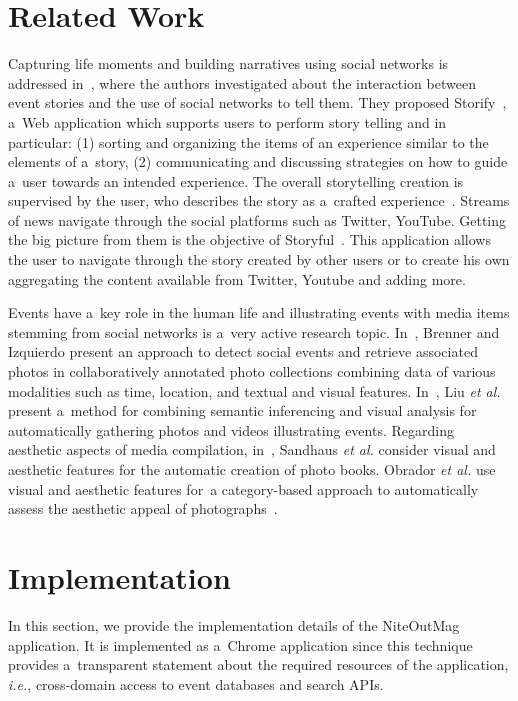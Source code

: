 \documentclass[runningheads,a4paper]{llncs}
\begin{document}
{\section{Related Work}                                                      \label{sec:related-work}
Capturing life moments and building narratives using social networks is addressed in~\cite{Atosy2011}, where the authors investigated about the interaction between event stories and the use of social networks to tell them. They proposed Storify~\cite{Storify2012}, a~Web application which supports users to perform story telling and in particular: (1) sorting and organizing the items of an experience similar to the elements of a~story, (2) communicating and discussing strategies on how to guide a~user towards an intended experience. The overall storytelling creation is supervised by the user, who describes the story as a~crafted experience~\cite{Hassenzahl2010}. Streams of news navigate through the social platforms such as Twitter, YouTube. Getting the big picture from them is the objective of Storyful~\cite{Storyful2012}. This application allows the user to navigate through the story created by other users or to create his own aggregating the content available from Twitter, Youtube and adding more.

Events have a~key role in the human life and illustrating events with media items stemming from social networks is a~very active research topic. In~\cite{Brenner2012}, Brenner and Izquierdo present an approach to detect social events and retrieve associated photos in collaboratively annotated photo collections combining data of various modalities such as time, location, and textual and visual features. In~\cite{Liu2011}, Liu \emph{et al.} present a~method for combining semantic inferencing and visual analysis for automatically gathering photos and videos illustrating events. Regarding aesthetic aspects of media compilation, in~\cite{Sandhaus2011}, Sandhaus \emph{et al.} consider visual and aesthetic features for the automatic creation of photo books. Obrador \emph{et al.} use visual and aesthetic features for~a category-based approach to automatically assess the aesthetic appeal of photographs~\cite{Obrador2012}.


\section{Implementation}                                                    \label{sec:implementation}
In this section, we provide the implementation details of the NiteOutMag application. It is implemented as a~Chrome application since this technique provides a~transparent statement about the required resources of the application, \emph{i.e.}, cross-domain access to event databases and search APIs.

}
\end{document}
